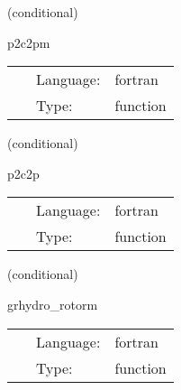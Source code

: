 \vspace{5mm}

   (conditional) 

\hspace{5mm} p2c2pm 

\hspace{5mm}{\it testing primitive to conservative to primitive - mhd version } 


\hspace{5mm}

 \begin{tabular*}{160mm}{cll} 
~ & Language:  & fortran \\ 
~ & Type:  & function \\ 
\end{tabular*} 


\vspace{5mm}

   (conditional) 

\hspace{5mm} p2c2p 

\hspace{5mm}{\it testing primitive to conservative to primitive } 


\hspace{5mm}

 \begin{tabular*}{160mm}{cll} 
~ & Language:  & fortran \\ 
~ & Type:  & function \\ 
\end{tabular*} 


\vspace{5mm}

   (conditional) 

\hspace{5mm} grhydro\_rotorm 

\hspace{5mm}{\it mhd rotor initial data } 


\hspace{5mm}

 \begin{tabular*}{160mm}{cll} 
~ & Language:  & fortran \\ 
~ & Type:  & function \\ 
\end{tabular*} 


\vspace{5mm}

